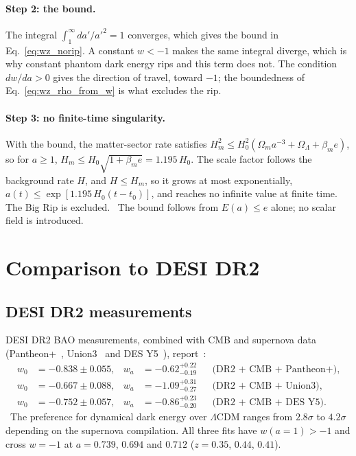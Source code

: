 \paragraph{Step 2: the bound.} The integral $\int_1^\infty da'/a'^2=1$ converges, which gives the bound in Eq.~\eqref{eq:wz_norip}. A constant
$w<-1$ makes the same integral diverge, which is why constant phantom dark energy rips and this term does not. The condition $dw/da>0$ gives the
direction of travel, toward $-1$; the boundedness of Eq.~\eqref{eq:wz_rho_from_w} is what excludes the rip. \derived

\paragraph{Step 3: no finite-time singularity.} With the bound, the matter-sector rate satisfies
$H_m^2\le H_0^2(\Omega_ma^{-3}+\Omega_\Lambda+\beta_me)$, so for $a\ge1$, $H_m\le H_0\sqrt{1+\beta_me}=1.195\,H_0$. The scale factor follows the background rate $H$, and $H\le H_m$, so it grows at
most exponentially, $a(t)\le\exp[1.195\,H_0(t-t_0)]$, and reaches no infinite value at finite time. The Big Rip is excluded. \derived\ The bound
follows from $E(a)\le e$ alone; no scalar field is introduced.

\section{Comparison to DESI DR2}\label{sec:wz_cplsign}
\subsection{DESI DR2 measurements}
DESI DR2 BAO measurements, combined with CMB and supernova data (Pantheon+~\cite{Brout2022}, Union3~\cite{Rubin2025} and DES Y5~\cite{DESY5SN2024}), report~\cite{DESI2025}:
\begin{align}
w_0&=-0.838\pm0.055,& w_a&=-0.62^{+0.22}_{-0.19} &&\text{(DR2 + CMB + Pantheon+)},\label{eq:wz_desi1}\\
w_0&=-0.667\pm0.088,& w_a&=-1.09^{+0.31}_{-0.27} &&\text{(DR2 + CMB + Union3)},\label{eq:wz_desi2}\\
w_0&=-0.752\pm0.057,& w_a&=-0.86^{+0.23}_{-0.20} &&\text{(DR2 + CMB + DES Y5)}.\label{eq:wz_desi3}
\end{align}
\observed\ The preference for dynamical dark energy over $\Lambda$CDM ranges from $2.8\sigma$ to $4.2\sigma$ depending on the supernova
compilation. All three fits have $w(a=1)>-1$ and cross $w=-1$ at $a=0.739$, $0.694$ and $0.712$ ($z=0.35$, $0.44$, $0.41$). \calc

